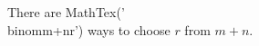 \documentclass[preview]{standalone}
\begin{document}
\begin{center}
There are MathTex('\\binom{m+n}{r}') ways to choose $r$ from $m+n$.
\end{center}
\end{document}
